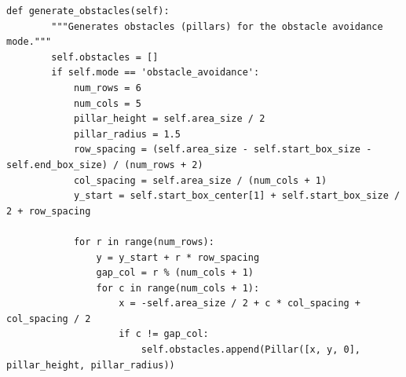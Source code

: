 \documentclass[11pt]{article}
\begin{document}
\begin{lstlisting}[style=pythonstyle]
    def generate_obstacles(self):
        """Generates obstacles (pillars) for the obstacle avoidance mode."""
        self.obstacles = []
        if self.mode == 'obstacle_avoidance':
            num_rows = 6
            num_cols = 5
            pillar_height = self.area_size / 2
            pillar_radius = 1.5
            row_spacing = (self.area_size - self.start_box_size - self.end_box_size) / (num_rows + 2)
            col_spacing = self.area_size / (num_cols + 1)
            y_start = self.start_box_center[1] + self.start_box_size / 2 + row_spacing

            for r in range(num_rows):
                y = y_start + r * row_spacing
                gap_col = r % (num_cols + 1)
                for c in range(num_cols + 1):
                    x = -self.area_size / 2 + c * col_spacing + col_spacing / 2
                    if c != gap_col:
                        self.obstacles.append(Pillar([x, y, 0], pillar_height, pillar_radius))


\end{lstlisting}
\end{document}
